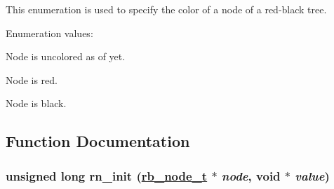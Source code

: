 This enumeration is used to specify the color of a node of a red-black tree. \begin{Desc}
\item[Enumeration values: ]\par
\begin{description}
\item[{\em 
\hypertarget{group__dbprim__rbtree_a38a137}{
{\em RB\_\-COLOR\_\-NONE}}
\label{group__dbprim__rbtree_a38a137}
}]Node is uncolored as of yet. \item[{\em 
\hypertarget{group__dbprim__rbtree_a38a138}{
{\em RB\_\-COLOR\_\-RED}}
\label{group__dbprim__rbtree_a38a138}
}]Node is red. \item[{\em 
\hypertarget{group__dbprim__rbtree_a38a139}{
{\em RB\_\-COLOR\_\-BLACK}}
\label{group__dbprim__rbtree_a38a139}
}]Node is black. \end{description}
\end{Desc}



\subsection{Function Documentation}
\hypertarget{group__dbprim__rbtree_a13}{
\subsubsection[rn\_\-init]{\setlength{\rightskip}{0pt plus 5cm}unsigned long rn\_\-init (\hyperlink{group__dbprim__rbtree_a1}{rb\_\-node\_\-t} $\ast$ {\em node}, void $\ast$ {\em value})}}
\label{group__dbprim__rbtree_a13}


